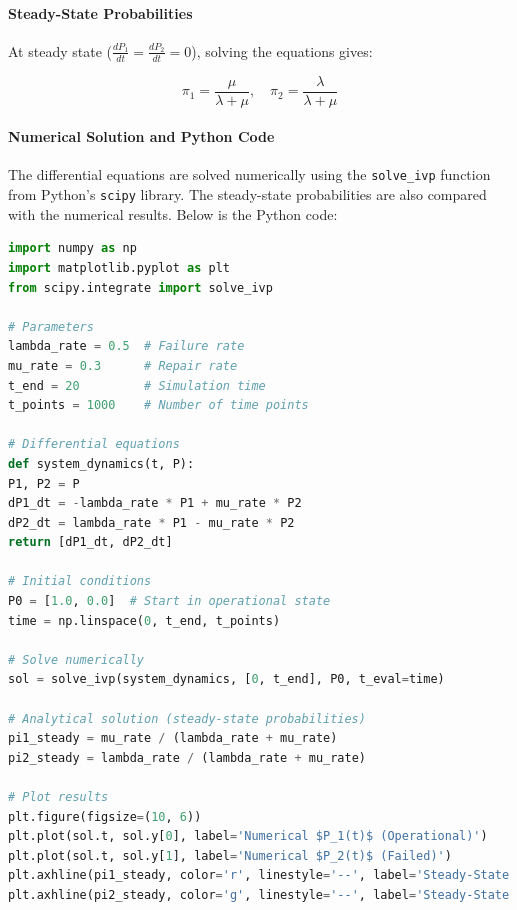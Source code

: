 \documentclass[a4paper,12pt]{article}
\begin{document}
	
	\begin{answerbox}
		\paragraph{Steady-State Probabilities}
		At steady state (\( \frac{dP_1}{dt} = \frac{dP_2}{dt} = 0 \)), solving the equations gives:
		
		\[
		\pi_1 = \frac{\mu}{\lambda + \mu}, \quad \pi_2 = \frac{\lambda}{\lambda + \mu}
		\]
		
		\paragraph{Numerical Solution and Python Code}
		The differential equations are solved numerically using the \texttt{solve\_ivp} function from Python’s \texttt{scipy} library. The steady-state probabilities are also compared with the numerical results. Below is the Python code:
		
		
\begin{lstlisting}[language=Python]
import numpy as np
import matplotlib.pyplot as plt
from scipy.integrate import solve_ivp

# Parameters
lambda_rate = 0.5  # Failure rate
mu_rate = 0.3      # Repair rate
t_end = 20         # Simulation time
t_points = 1000    # Number of time points

# Differential equations
def system_dynamics(t, P):
P1, P2 = P
dP1_dt = -lambda_rate * P1 + mu_rate * P2
dP2_dt = lambda_rate * P1 - mu_rate * P2
return [dP1_dt, dP2_dt]

# Initial conditions
P0 = [1.0, 0.0]  # Start in operational state
time = np.linspace(0, t_end, t_points)

# Solve numerically
sol = solve_ivp(system_dynamics, [0, t_end], P0, t_eval=time)

# Analytical solution (steady-state probabilities)
pi1_steady = mu_rate / (lambda_rate + mu_rate)
pi2_steady = lambda_rate / (lambda_rate + mu_rate)

# Plot results
plt.figure(figsize=(10, 6))
plt.plot(sol.t, sol.y[0], label='Numerical $P_1(t)$ (Operational)')
plt.plot(sol.t, sol.y[1], label='Numerical $P_2(t)$ (Failed)')
plt.axhline(pi1_steady, color='r', linestyle='--', label='Steady-State $\pi_1$')
plt.axhline(pi2_steady, color='g', linestyle='--', label='Steady-State $\pi_2$')

\end{lstlisting}
\end{answerbox}
\end{document}
